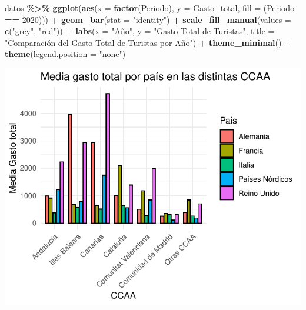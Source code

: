 \documentclass[data,article,submit,moreauthors,pdftex]{Definitions/mdpi}
\newenvironment{Shaded}{\begin{snugshade}}{\end{snugshade}}
\newcommand{\AttributeTok}[1]{\textcolor[rgb]{0.13,0.29,0.53}{#1}}
\newcommand{\DecValTok}[1]{\textcolor[rgb]{0.00,0.00,0.81}{#1}}
\newcommand{\FunctionTok}[1]{\textcolor[rgb]{0.13,0.29,0.53}{\textbf{#1}}}
\newcommand{\NormalTok}[1]{#1}
\newcommand{\SpecialCharTok}[1]{\textcolor[rgb]{0.81,0.36,0.00}{\textbf{#1}}}
\newcommand{\StringTok}[1]{\textcolor[rgb]{0.31,0.60,0.02}{#1}}
\begin{document}
\begin{Shaded}
\begin{Highlighting}[]
\NormalTok{datos }\SpecialCharTok{\%\textgreater{}\%} \FunctionTok{ggplot}\NormalTok{(}\FunctionTok{aes}\NormalTok{(}\AttributeTok{x =} \FunctionTok{factor}\NormalTok{(Periodo), }\AttributeTok{y =}\NormalTok{ Gasto\_total, }\AttributeTok{fill =}\NormalTok{ (Periodo }\SpecialCharTok{==} \DecValTok{2020}\NormalTok{))) }\SpecialCharTok{+}
  \FunctionTok{geom\_bar}\NormalTok{(}\AttributeTok{stat =} \StringTok{"identity"}\NormalTok{) }\SpecialCharTok{+}
  \FunctionTok{scale\_fill\_manual}\NormalTok{(}\AttributeTok{values =} \FunctionTok{c}\NormalTok{(}\StringTok{"grey"}\NormalTok{, }\StringTok{"red"}\NormalTok{)) }\SpecialCharTok{+}
  \FunctionTok{labs}\NormalTok{(}\AttributeTok{x =} \StringTok{"Año"}\NormalTok{, }\AttributeTok{y =} \StringTok{"Gasto Total de Turistas"}\NormalTok{, }\AttributeTok{title =} \StringTok{"Comparación del Gasto Total de Turistas por Año"}\NormalTok{) }\SpecialCharTok{+}
  \FunctionTok{theme\_minimal}\NormalTok{() }\SpecialCharTok{+}
  \FunctionTok{theme}\NormalTok{(}\AttributeTok{legend.position =} \StringTok{"none"}\NormalTok{)}
\end{Highlighting}
\end{Shaded}

\includegraphics{ProyectoAED2024_Rmd_files/figure-latex/unnamed-chunk-23-1.pdf}
\end{document}
